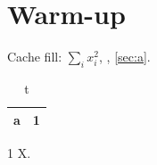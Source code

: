 \documentclass[11pt]{article}
\begin{document}
\section{Warm-up}
Cache fill: $\sum_i x_i^2$, \cite{x}, \cref{sec:a}. \label{sec:a}
\begin{table}[h]\centering\begin{tabular}{lr}\toprule a & 1\\\bottomrule\end{tabular}\caption{t}\end{table}
\begin{thebibliography}{1} X.\end{thebibliography}
\end{document}
